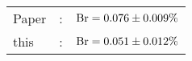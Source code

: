       \begin{tabular}{lcr}
          Paper &:& $\mathrm{Br}  = 0.076\pm 0.009\%$ \\
          this      &:& $\mathrm{Br}  = 0.051\pm 0.012\%$ \\        
      \end{tabular}

